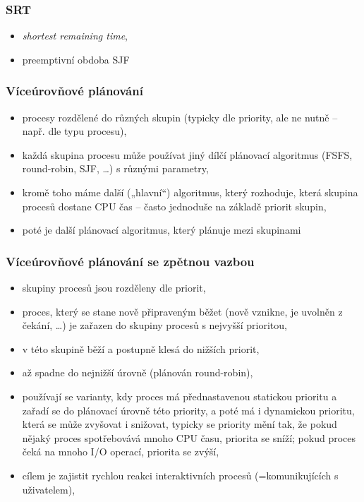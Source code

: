 \documentclass[a4paper, 11pt]{article}
\begin{document}
\subsubsection{SRT}
\begin{itemize}
    \item \emph{shortest remaining time},
    \item preemptivní obdoba SJF
\end{itemize}

\subsubsection{Víceúrovňové plánování}
\begin{itemize}
    \item procesy rozdělené do různých skupin (typicky dle priority, ale ne nutně -- např. dle typu procesu),
    \item každá skupina procesu může používat jiný dílčí plánovací algoritmus (FSFS, round-robin, SJF, \ldots) s různými parametry,
    \item kromě toho máme další („hlavní“) algoritmus, který rozhoduje, která skupina procesů dostane CPU čas -- často jednoduše na základě priorit skupin,
    \item poté je další plánovací algoritmus, který plánuje mezi skupinami
\end{itemize}
 
\subsubsection{Víceúrovňové plánování se zpětnou vazbou}
\begin{itemize}
    \item skupiny procesů jsou rozděleny dle priorit,
    \item proces, který se stane nově připraveným běžet (nově vznikne, je uvolněn z čekání, \ldots) je zařazen do skupiny procesů s nejvyšší prioritou,
    \item v této skupině běží a postupně klesá do nižších priorit,
    \item až spadne do nejnižší úrovně (plánován round-robin),
    \item používají se varianty, kdy proces má přednastavenou statickou prioritu a zařadí se do plánovací úrovně této priority, a poté má i dynamickou prioritu, která se může zvyšovat i snižovat, typicky se priority mění tak, že pokud nějaký proces spotřebovává mnoho CPU času, priorita se sníží; pokud proces čeká na mnoho I/O operací, priorita se zvýší,
    \item cílem je zajistit rychlou reakci interaktivních procesů (=komunikujících s uživatelem),
\end{itemize}
\end{document}
